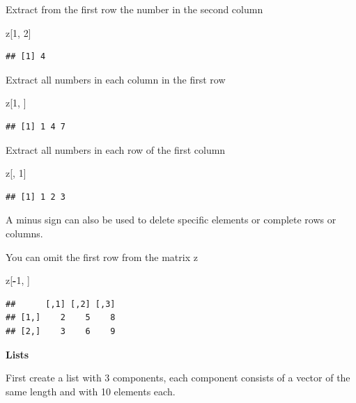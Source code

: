 \documentclass[]{book}
\newenvironment{Shaded}{\begin{snugshade}}{\end{snugshade}}
\newcommand{\DecValTok}[1]{\textcolor[rgb]{0.00,0.00,0.81}{#1}}
\newcommand{\OperatorTok}[1]{\textcolor[rgb]{0.81,0.36,0.00}{\textbf{#1}}}
\newcommand{\NormalTok}[1]{#1}
\begin{document}
Extract from the first row the number in the second column

\begin{Shaded}
\begin{Highlighting}[]
\NormalTok{z[}\DecValTok{1}\NormalTok{, }\DecValTok{2}\NormalTok{]}
\end{Highlighting}
\end{Shaded}

\begin{verbatim}
## [1] 4
\end{verbatim}

Extract all numbers in each column in the first row

\begin{Shaded}
\begin{Highlighting}[]
\NormalTok{z[}\DecValTok{1}\NormalTok{, ]}
\end{Highlighting}
\end{Shaded}

\begin{verbatim}
## [1] 1 4 7
\end{verbatim}

Extract all numbers in each row of the first column

\begin{Shaded}
\begin{Highlighting}[]
\NormalTok{z[, }\DecValTok{1}\NormalTok{]}
\end{Highlighting}
\end{Shaded}

\begin{verbatim}
## [1] 1 2 3
\end{verbatim}

A minus sign can also be used to delete specific elements or complete
rows or columns.

You can omit the first row from the matrix z

\begin{Shaded}
\begin{Highlighting}[]
\NormalTok{z[}\OperatorTok{-}\DecValTok{1}\NormalTok{, ]}
\end{Highlighting}
\end{Shaded}

\begin{verbatim}
##      [,1] [,2] [,3]
## [1,]    2    5    8
## [2,]    3    6    9
\end{verbatim}

\textbf{Lists}

First create a list with 3 components, each component consists of a
vector of the same length and with 10 elements each.
\end{document}
